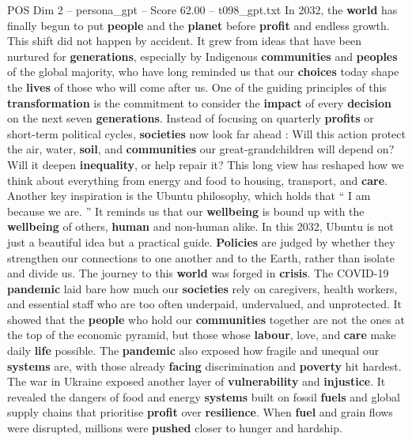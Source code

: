 \begin{textsample}{POS Dim 2 – persona\_gpt – Score 62.00 – t098\_gpt.txt}  \label{ex:f2_pos_007}
In 2032, the \textbf{world} has finally begun to put \textbf{people} and the \textbf{planet} before \textbf{profit} and endless growth.
This shift did not happen by accident.
It grew from ideas that have been nurtured for \textbf{generations}, especially by Indigenous \textbf{communities} and \textbf{peoples} of the global majority, who have long reminded us that our \textbf{choices} today shape the \textbf{lives} of those who will come after us.
One of the guiding principles of this \textbf{transformation} is the commitment to consider the \textbf{impact} of every \textbf{decision} on the next seven \textbf{generations}.
Instead of focusing on quarterly \textbf{profits} or short-term political cycles, \textbf{societies} now look far ahead : Will this action protect the air, water, \textbf{soil}, and \textbf{communities} our great‑grandchildren will depend on?
Will it deepen \textbf{inequality}, or help repair it?
This long view has reshaped how we think about everything from energy and food to housing, transport, and \textbf{care}.
Another key inspiration is the Ubuntu philosophy, which holds that “ I am because we are. ” It reminds us that our \textbf{wellbeing} is bound up with the \textbf{wellbeing} of others, \textbf{human} and non-human alike.
In this 2032, Ubuntu is not just a beautiful idea but a practical guide. \textbf{Policies} are judged by whether they strengthen our connections to one another and to the Earth, rather than isolate and divide us.
The journey to this \textbf{world} was forged in \textbf{crisis}.
The COVID-19 \textbf{pandemic} laid bare how much our \textbf{societies} rely on caregivers, health workers, and essential staff who are too often underpaid, undervalued, and unprotected.
It showed that the \textbf{people} who hold our \textbf{communities} together are not the ones at the top of the economic pyramid, but those whose \textbf{labour}, love, and \textbf{care} make daily \textbf{life} possible.
The \textbf{pandemic} also exposed how fragile and unequal our \textbf{systems} are, with those already \textbf{facing} discrimination and \textbf{poverty} hit hardest.
The war in Ukraine exposed another layer of \textbf{vulnerability} and \textbf{injustice}.
It revealed the dangers of food and energy \textbf{systems} built on fossil \textbf{fuels} and global supply chains that prioritise \textbf{profit} over \textbf{resilience}.
When \textbf{fuel} and grain flows were disrupted, millions were \textbf{pushed} closer to hunger and hardship.

\end{textsample}
